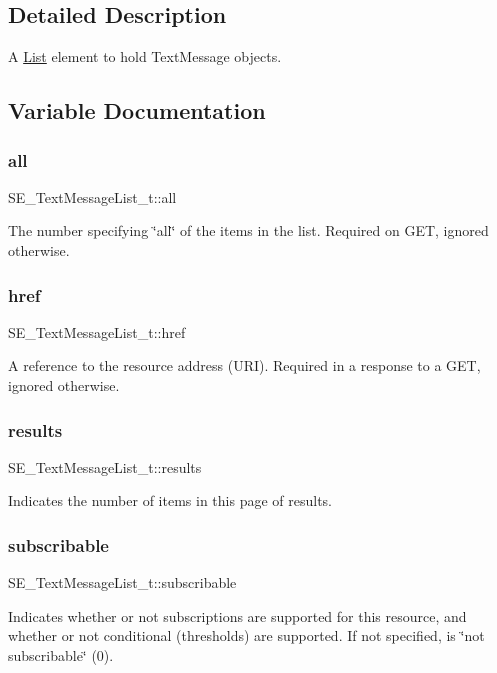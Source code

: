 \subsection{Detailed Description}
A \hyperlink{structList}{List} element to hold Text\+Message objects. 

\subsection{Variable Documentation}
\mbox{\label{group__TextMessageList_gae0e3024c0f3f00ac06820200dd03e8f7}} 
\subsubsection{\texorpdfstring{all}{all}}
{\footnotesize\ttfamily S\+E\+\_\+\+Text\+Message\+List\+\_\+t\+::all}

The number specifying \char`\"{}all\char`\"{} of the items in the list. Required on G\+ET, ignored otherwise. \mbox{\label{group__TextMessageList_ga20a37c16ba898b155d07ffbabba88d71}} 
\subsubsection{\texorpdfstring{href}{href}}
{\footnotesize\ttfamily S\+E\+\_\+\+Text\+Message\+List\+\_\+t\+::href}

A reference to the resource address (U\+RI). Required in a response to a G\+ET, ignored otherwise. \mbox{\label{group__TextMessageList_ga1ddf4d774f7b963a68dd927dbd8ab2b3}} 
\subsubsection{\texorpdfstring{results}{results}}
{\footnotesize\ttfamily S\+E\+\_\+\+Text\+Message\+List\+\_\+t\+::results}

Indicates the number of items in this page of results. \mbox{\label{group__TextMessageList_ga4c361e5636bcdbbb0dbf66d4f2ea106e}} 
\subsubsection{\texorpdfstring{subscribable}{subscribable}}
{\footnotesize\ttfamily S\+E\+\_\+\+Text\+Message\+List\+\_\+t\+::subscribable}

Indicates whether or not subscriptions are supported for this resource, and whether or not conditional (thresholds) are supported. If not specified, is \char`\"{}not subscribable\char`\"{} (0). 